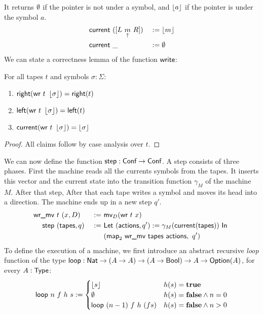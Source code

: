 \documentclass{psartcl}
\begin{document}
It returns $\emptyset$ if the pointer is not under a symbol, and $\left\lfloor {a}\right\rfloor$ if the pointer is under the symbol $a$.
\begin{alignat*}{2}
  \textsf{current}&~([ L~\underset{\uparrow}{m}~R ])&&:= \left\lfloor {m}\right\rfloor \\
  \textsf{current}&~\_                 &&:= \emptyset
\end{alignat*}
We can state a correctness lemma of the function $\textsf{write}$:
\begin{lemma}[Write]
  \label{lem:write}
  For all tapes $t$ and symbols $\sigma:\Sigma$:
  \begin{enumerate}
    \item $\textsf{right}   (\textsf{wr}~t~\left\lfloor {\sigma}\right\rfloor) = \textsf{right}(t)$
    \item $\textsf{left}    (\textsf{wr}~t~\left\lfloor {\sigma}\right\rfloor) = \textsf{left} (t)$
    \item $\textsf{current} (\textsf{wr}~t~\left\lfloor {\sigma}\right\rfloor) = \left\lfloor {\sigma}\right\rfloor$
  \end{enumerate}
\end{lemma}
\begin{proof}
  All claims follow by case analysis over $t$.
\end{proof}
We can now define the function $\textsf{step} : \textsf{Conf} \rightarrow \textsf{Conf}$.  A step consists of three phases.  First the machine reads all the currents
symbols from the tapes.  It inserts this vector and the current state into the transition function $\gamma_M$ of the machine $M$.  After that step,
After that each tape writes a symbol and moves its head into a direction.  The machine ends up in a new step $q'$.
\begin{alignat*}{2}
  \textsf{wr\_mv}&~t~(x, D)      &~:=~& \textsf{mv}_D (\textsf{wr}~t~x) \\
  \textsf{step}&~(\textsf{tapes}, q) &~:=~& \textsf{Let}~(\textsf{actions}, q') := \gamma_M(\textsf{current}(\textsf{tapes}))~\textsf{In}~ \\
           &                  &~  ~& (\textsf{map}_2~\textsf{wr\_mv}~\textsf{tapes}~\textsf{actions},~ q')
\end{alignat*}
To define the execution of a machine, we first introduce an abstract recursive \emph{loop} function of the type
$\textsf{loop} : \textsf{Nat} \rightarrow (A \rightarrow A) \rightarrow (A \rightarrow \textsf{Bool}) \rightarrow A \rightarrow \textsf{Option}(A)$, for every $A:\textsf{Type}$:
\begin{align*}
  \textsf{loop}~n~f~h~s :=
  \begin{cases}
    \left\lfloor {s}\right\rfloor              & h(s) = \mathbf{true} \\
    \emptyset                 & h(s) = \mathbf{false} \land n = 0 \\
    \textsf{loop}~(n-1)~f~h~(f s)  & h(s) = \mathbf{false} \land n > 0
  \end{cases}
\end{align*}
\end{document}

